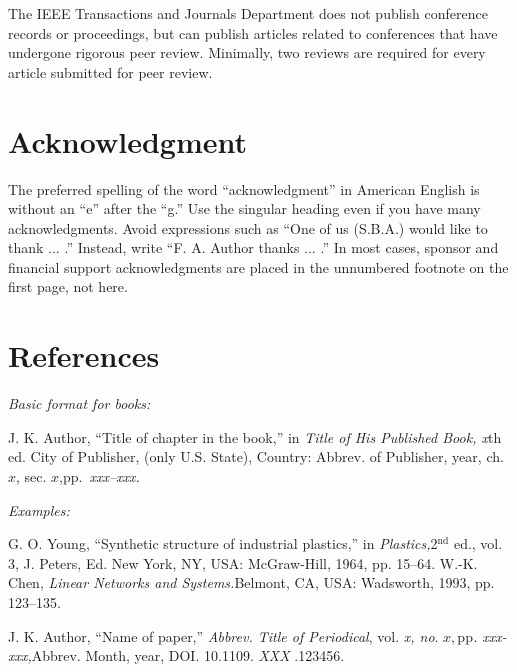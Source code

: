 \documentclass[journal,twoside,web]{ieeecolor}
\begin{document}
The IEEE Transactions and Journals Department does not publish conference 
records or proceedings, but can publish articles related to conferences that 
have undergone rigorous peer review. Minimally, two reviews are required for 
every article submitted for peer review.

\section*{Acknowledgment}

The preferred spelling of the word ``acknowledgment'' in American English is 
without an ``e'' after the ``g.'' Use the singular heading even if you have 
many acknowledgments. Avoid expressions such as ``One of us (S.B.A.) would 
like to thank $\ldots$ .'' Instead, write ``F. A. Author thanks $\ldots$ .'' In most 
cases, sponsor and financial support acknowledgments are placed in the 
unnumbered footnote on the first page, not here.

\section*{References}

\def\refname{\vadjust{\vspace*{-2.5em}}} %

\noindent\textit{Basic format for books:}

\noindent J. K. Author, ``Title of chapter in the book,'' in {\it Title of His Published Book, x}th ed. City of Publisher,
(only U.S. State), Country: Abbrev. of Publisher, year, ch. $x$, sec. $x$,\break pp.~{\it xxx--xxx.}

{\it Examples:}{\vadjust{\vspace*{-2.5em}}}
\begin{thebibliography}{00}
 G. O. Young, ``Synthetic structure of industrial plastics,'' in {\it Plastics,}2$^{\mathrm{nd}}$ ed., vol. 3, J. Peters, Ed. New York, NY, USA: McGraw-Hill, 1964, pp. 15--64.
 W.-K. Chen, {\it Linear Networks and Systems.}Belmont, CA, USA: Wadsworth, 1993, pp. 123--135.
\end{thebibliography}


\noindent J. K. Author, ``Name of paper,'' {\it Abbrev. Title of Periodical}, vol. {\it x, no}. $x, $pp{\it . xxx-xxx,}Abbrev. Month, year, DOI.
 {10.1109.} {{\it XXX}} {.123456}.
\end{document}

